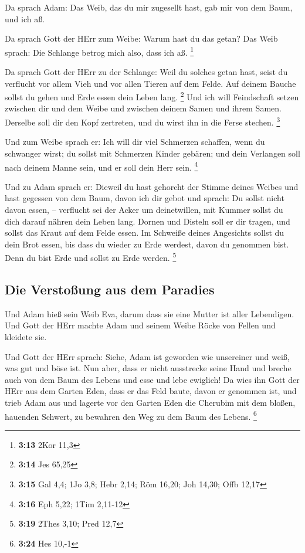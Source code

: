  Da sprach Adam: Das Weib, das du mir zugesellt hast, gab
mir von dem Baum, und ich aß.

 Da sprach Gott der HErr zum Weibe: Warum hast du das
getan? Das Weib sprach: Die Schlange betrog mich also, dass ich aß.
\footnote{\textbf{3:13} 2Kor 11,3}

 Da sprach Gott der HErr zu der Schlange: Weil du solches
getan hast, seist du verflucht vor allem Vieh und vor allen Tieren auf
dem Felde. Auf deinem Bauche sollst du gehen und Erde essen dein Leben
lang. \footnote{\textbf{3:14} Jes 65,25}  Und ich will
Feindschaft setzen zwischen dir und dem Weibe und zwischen deinem Samen
und ihrem Samen. Derselbe soll dir den Kopf zertreten, und du wirst ihn
in die Ferse stechen. \footnote{\textbf{3:15} Gal 4,4; 1Jo 3,8; Hebr
  2,14; Röm 16,20; Joh 14,30; Offb 12,17}

 Und zum Weibe sprach er: Ich will dir viel Schmerzen
schaffen, wenn du schwanger wirst; du sollst mit Schmerzen Kinder
gebären; und dein Verlangen soll nach deinem Manne sein, und er soll
dein Herr sein. \footnote{\textbf{3:16} Eph 5,22; 1Tim 2,11-12}

 Und zu Adam sprach er: Dieweil du hast gehorcht der
Stimme deines Weibes und hast gegessen von dem Baum, davon ich dir gebot
und sprach: Du sollst nicht davon essen, -- verflucht sei der Acker um
deinetwillen, mit Kummer sollst du dich darauf nähren dein Leben lang.
 Dornen und Disteln soll er dir tragen, und sollst das
Kraut auf dem Felde essen.  Im Schweiße deines Angesichts
sollst du dein Brot essen, bis dass du wieder zu Erde werdest, davon du
genommen bist. Denn du bist Erde und sollst zu Erde werden. \footnote{\textbf{3:19}
  2Thes 3,10; Pred 12,7}

\hypertarget{die-verstouxdfung-aus-dem-paradies}{%
\subsection{Die Verstoßung aus dem
Paradies}\label{die-verstouxdfung-aus-dem-paradies}}

 Und Adam hieß sein Weib Eva, darum dass sie eine Mutter
ist aller Lebendigen.  Und Gott der HErr machte Adam und
seinem Weibe Röcke von Fellen und kleidete sie.

 Und Gott der HErr sprach: Siehe, Adam ist geworden wie
unsereiner und weiß, was gut und böse ist. Nun aber, dass er nicht
ausstrecke seine Hand und breche auch von dem Baum des Lebens und esse
und lebe ewiglich!  Da wies ihn Gott der HErr aus dem
Garten Eden, dass er das Feld baute, davon er genommen ist,
 und trieb Adam aus und lagerte vor den Garten Eden die
Cherubim mit dem bloßen, hauenden Schwert, zu bewahren den Weg zu dem
Baum des Lebens. \footnote{\textbf{3:24} Hes 10,-1}

